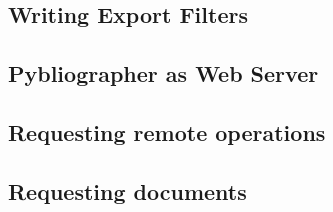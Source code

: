 
  




\subsection{Writing Export Filters}
\label{sec:exportfilter}


\subsection{Pybliographer as Web Server }
\label{sec:pybweb}


\subsection{Requesting remote operations}
\label{sec:remotereq}


\subsection{Requesting documents}
\label{sec:docrequest}



